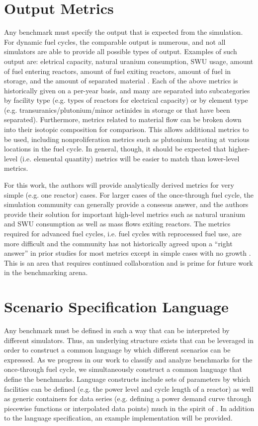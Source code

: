 \documentclass{anstrans}
\begin{document}
\section{Output Metrics}
Any benchmark must specify the output that is expected from the simulation. For
dynamic fuel cycles, the comparable output is numerous, and not all simulators
are able to provide all possible types of output. Examples of such output are:
eletrical capacity, natural uranium consumption, SWU usage, amount of fuel
entering reactors, amount of fuel exiting reactors, amount of fuel in storage,
and the amount of separated material
\cite{boucher_specification_2008}\cite{guerin_benchmark_2009}. Each of the above
metrics is historically given on a per-year basis, and many are separated into
subcategories by facility type (e.g. types of reactors for electrical capacity)
or by element type (e.g. transuranics/plutonium/minor actinides in storage or
that have been separated). Furthermore, metrics related to material flow can be
broken down into their isotopic composition for comparison. This allows
additional metrics to be used, including nonproliferation metrics such as
plutonium heating at various locations in the fuel cycle. In general, though, it
should be expected that higher-level (i.e. elemental quantity) metrics will be
easier to match than lower-level metrics.

For this work, the authors will provide analytically derived metrics for very
simple (e.g. one reactor) cases. For larger cases of the once-through fuel
cycle, the simulation community can generally provide a consesus answer, and the
authors provide their solution for important high-level metrics such as natural
uranium and SWU consumption as well as mass flows exiting reactors. The metrics
required for advanced fuel cycles, i.e. fuel cycles with reprocessed fuel use,
are more difficult and the community has not historically agreed upon a ``right
answer'' in prior studies for most metrics except in simple cases with no growth
\cite{guerin_benchmark_2009}. This is an area that requires continued
collaboration and is prime for future work in the benchmarking arena.

\section{Scenario Specification Language}
Any benchmark must be defined in such a way that can be interpreted by different
simulators. Thus, an underlying structure exists that can be leveraged in order
to construct a common language by which different scenarios can be expressed. As
we progress in our work to classify and analyze benchmarks for the once-through
fuel cycle, we simultaneously construct a common language that define the
benchmarks. Language constructs include sets of parameters by which facilities
can be defined (e.g. the power level and cycle length of a reactor) as well as
generic containers for data series (e.g. defining a power demand curve through
piecewise functions or interpolated data points) much in the spirit of
\cite{mattoon_generalized_2012}. In addition to the language specification, an
example implementation will be provided.
\end{document}
